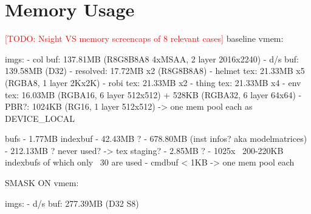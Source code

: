 
\section{Memory Usage}
\textcolor{red}{[TODO: Nsight VS memory screencaps of 8 relevant cases]}
baseline vmem: 

	imgs:
	- col buf: 137.81MB (R8G8B8A8 4xMSAA, 2 layer 2016x2240)
	- d/s buf: 139.58MB (D32)
	- resolved: 17.72MB x2 (R8G8B8A8)
	- helmet tex: 21.33MB x5 (RGBA8, 1 layer 2Kx2K)
	- robi tex: 21.33MB x2
	- thing tex: 21.33MB x4
	- env tex: 16.03MB (RGBA16, 6 layer 512x512) + 528KB (RGBA32, 6 layer 64x64)
	- PBR?: 1024KB (RG16, 1 layer 512x512)
	-> one mem pool each as DEVICE_LOCAL

	bufs
	- 1.77MB indexbuf
	- 42.43MB ?
	- 678.80MB (inst infos? aka modelmatrices)
	- 212.13MB ? never used? -> tex staging?
	- 2.85MB ?
	- 1025x ~200-220KB indexbufs of which only ~30 are used
	- cmdbuf < 1KB
	-> one mem pool each
	
SMASK ON vmem:

	imgs: 
	- d/s buf: 277.39MB (D32 S8)